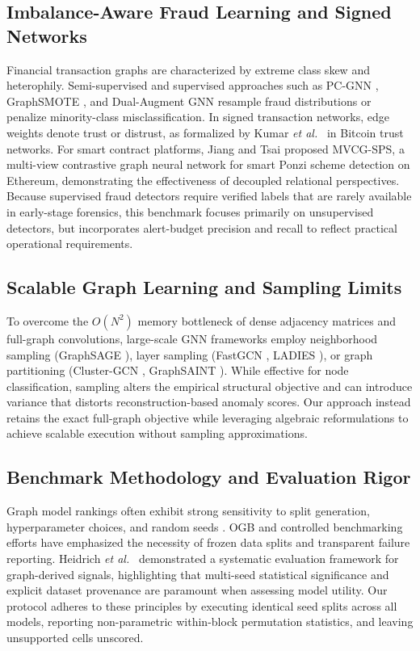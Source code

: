 \documentclass[11pt,a4paper]{article}
\newcommand{\etal}{\emph{et al.}}
\begin{document}
\subsection{Imbalance-Aware Fraud Learning and Signed Networks}
Financial transaction graphs are characterized by extreme class skew and heterophily. Semi-supervised and supervised approaches such as PC-GNN \cite{liu2021pcgnn}, GraphSMOTE \cite{zhao2021graphsmote}, and Dual-Augment GNN \cite{li2022dualaugment} resample fraud distributions or penalize minority-class misclassification. In signed transaction networks, edge weights denote trust or distrust, as formalized by Kumar \etal\ \cite{kumar2016edge} in Bitcoin trust networks. For smart contract platforms, Jiang and Tsai \cite{jiang2025mvcg} proposed MVCG-SPS, a multi-view contrastive graph neural network for smart Ponzi scheme detection on Ethereum, demonstrating the effectiveness of decoupled relational perspectives. Because supervised fraud detectors require verified labels that are rarely available in early-stage forensics, this benchmark focuses primarily on unsupervised detectors, but incorporates alert-budget precision and recall to reflect practical operational requirements.

\subsection{Scalable Graph Learning and Sampling Limits}
To overcome the $O(N^2)$ memory bottleneck of dense adjacency matrices and full-graph convolutions, large-scale GNN frameworks employ neighborhood sampling (GraphSAGE \cite{hamilton2017graphsage}), layer sampling (FastGCN \cite{chen2018fastgcn}, LADIES \cite{zou2019ladies}), or graph partitioning (Cluster-GCN \cite{chiang2019clustergcn}, GraphSAINT \cite{zeng2020graphsaint}). While effective for node classification, sampling alters the empirical structural objective and can introduce variance that distorts reconstruction-based anomaly scores. Our approach instead retains the exact full-graph objective while leveraging algebraic reformulations to achieve scalable execution without sampling approximations.

\subsection{Benchmark Methodology and Evaluation Rigor}
Graph model rankings often exhibit strong sensitivity to split generation, hyperparameter choices, and random seeds \cite{shchur2018pitfalls,errica2020fair}. OGB \cite{hu2020ogb} and controlled benchmarking efforts \cite{dwivedi2023benchmarking} have emphasized the necessity of frozen data splits and transparent failure reporting. Heidrich \etal\ \cite{heidrich2026systematic} demonstrated a systematic evaluation framework for graph-derived signals, highlighting that multi-seed statistical significance and explicit dataset provenance are paramount when assessing model utility. Our protocol adheres to these principles by executing identical seed splits across all models, reporting non-parametric within-block permutation statistics, and leaving unsupported cells unscored.
\end{document}
